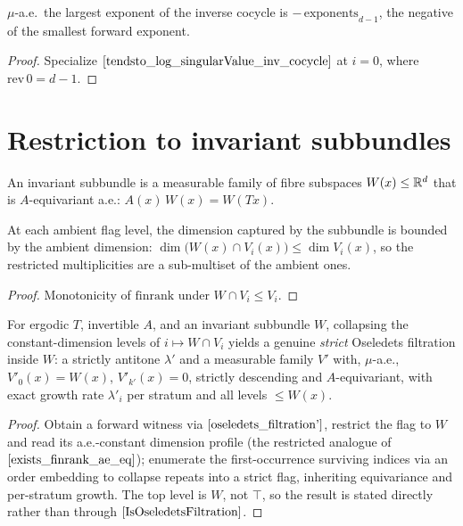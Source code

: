 \begin{corollary}\label{topExponent_inv_eq_neg_bot}
  \leanok
  $\mu$-a.e.\ the largest exponent of the inverse cocycle is $-\,\mathrm{exponents}_{d-1}$, the negative of the smallest forward exponent.
\end{corollary}
\begin{proof}\leanok
  Specialize $\ref{tendsto_log_singularValue_inv_cocycle}$ at $i = 0$, where $\mathrm{rev}\,0 = d-1$.
\end{proof}

\section{Restriction to invariant subbundles}

\begin{definition}\label{InvariantSubbundle}
  \leanok
  An invariant subbundle is a measurable family of fibre subspaces $W(x) \le \mathbb{R}^d$ that is $A$-equivariant a.e.: $A(x)\,W(x) = W(Tx)$.
\end{definition}

\begin{lemma}\label{restricted_finrank_le}
  \leanok
  At each ambient flag level, the dimension captured by the subbundle is bounded by the ambient dimension: $\dim\big(W(x) \cap V_i(x)\big) \le \dim V_i(x)$, so the restricted multiplicities are a sub-multiset of the ambient ones.
\end{lemma}
\begin{proof}\leanok
  Monotonicity of $\mathrm{finrank}$ under $W \cap V_i \le V_i$.
\end{proof}

\begin{theorem}\label{restricted_strict_filtration}
  \leanok
  For ergodic $T$, invertible $A$, and an invariant subbundle $W$, collapsing the constant-dimension levels of $i \mapsto W \cap V_i$ yields a genuine \emph{strict} Oseledets filtration inside $W$: a strictly antitone $\lambda'$ and a measurable family $V'$ with, $\mu$-a.e., $V'_0(x) = W(x)$, $V'_{k'}(x) = 0$, strictly descending and $A$-equivariant, with exact growth rate $\lambda'_i$ per stratum and all levels $\le W(x)$.
\end{theorem}
\begin{proof}\leanok
  Obtain a forward witness via $\ref{oseledets_filtration'}$, restrict the flag to $W$ and read its a.e.-constant dimension profile (the restricted analogue of $\ref{exists_finrank_ae_eq}$); enumerate the first-occurrence surviving indices via an order embedding to collapse repeats into a strict flag, inheriting equivariance and per-stratum growth. The top level is $W$, not $\top$, so the result is stated directly rather than through $\ref{IsOseledetsFiltration}$.
\end{proof}

